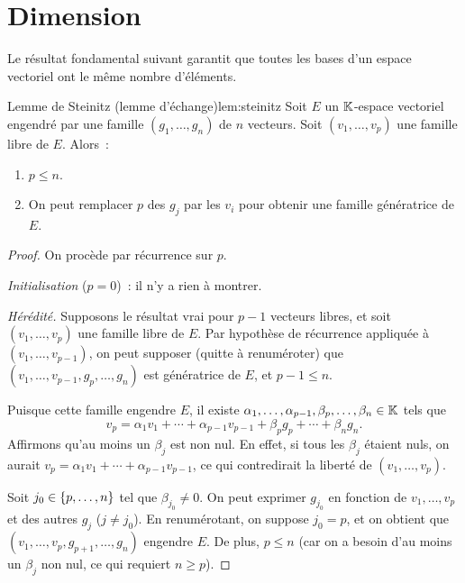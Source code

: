 \section{Dimension}\label{sec:dimension}

Le résultat fondamental suivant garantit que toutes les bases d'un
espace vectoriel ont le même nombre d'éléments.

\begin{lemma}{Lemme de Steinitz (lemme d'échange)}{lem:steinitz}
  Soit $E$ un ${\mathbb{K}}$-espace vectoriel engendré par une famille
  $(g_1,\ldots,g_n)$ de $n$ vecteurs. Soit $(v_1,\ldots,v_p)$ une
  famille libre de $E$. Alors~:
  \begin{enumerate}[label=(\roman*)]
    \item $p\leq n$.
    \item On peut remplacer $p$ des $g_j$ par les $v_i$ pour obtenir
      une famille génératrice de $E$.
  \end{enumerate}
\end{lemma}

\begin{proof}
  On procède par récurrence sur $p$.

  \emph{Initialisation} ($p=0$)~: il n'y a rien à montrer.

  \emph{Hérédité.} Supposons le résultat vrai pour $p-1$ vecteurs
  libres, et soit $(v_1,\ldots,v_p)$ une famille libre de $E$. Par
  hypothèse de récurrence appliquée à $(v_1,\ldots,v_{p-1})$, on peut
  supposer (quitte à renuméroter) que
  $(v_1,\ldots,v_{p-1},g_p,\ldots,g_n)$ est génératrice de $E$, et
  $p-1\leq n$.

  Puisque cette famille engendre $E$, il existe
  $\alpha_1,\ldots,\alpha_{p-1},\beta_p,\ldots,\beta_n\in{\mathbb{K}}$ tels que
  \[
    v_p = \alpha_1 v_1+\cdots+\alpha_{p-1}v_{p-1}+\beta_p g_p
    +\cdots+\beta_n g_n.
  \]
  Affirmons qu'au moins un $\beta_j$ est non nul. En effet, si tous
  les $\beta_j$ étaient nuls, on aurait
  $v_p = \alpha_1 v_1+\cdots+\alpha_{p-1}v_{p-1}$, ce qui
  contredirait la liberté de $(v_1,\ldots,v_p)$.

  Soit $j_0\in\left\{p,\ldots,n\right\}$ tel que $\beta_{j_0}\neq 0$. On peut
  exprimer $g_{j_0}$ en fonction de $v_1,\ldots,v_p$ et des autres
  $g_j$ ($j\neq j_0$). En renumérotant, on suppose $j_0=p$, et on
  obtient que $(v_1,\ldots,v_p,g_{p+1},\ldots,g_n)$ engendre $E$.
  De plus, $p\leq n$ (car on a besoin d'au moins un $\beta_j$ non nul,
  ce qui requiert $n\geq p$).
\end{proof}

